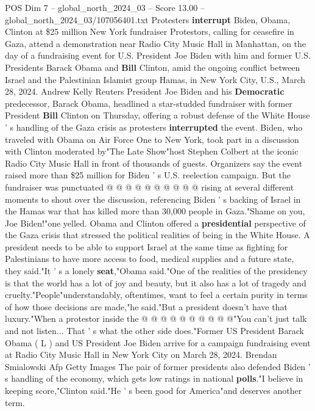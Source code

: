 \begin{textsample}{POS Dim 7 – global\_north\_2024\_03 – Score 13.00 – global\_north\_2024\_03/107056401.txt}  \label{ex:f7_pos_034}
Protesters \textbf{interrupt} Biden, Obama, Clinton at \$25 million New York fundraiser Protestors, calling for ceasefire in Gaza, attend a demonstration near Radio City Music Hall in Manhattan, on the day of a fundraising event for U.S.
President Joe Biden with him and former U.S.
Presidents Barack Obama and \textbf{Bill} Clinton, amid the ongoing conflict between Israel and the Palestinian Islamist group Hamas, in New York City, U.S., March 28, 2024.
Andrew Kelly Reuters President Joe Biden and his \textbf{Democratic} predecessor, Barack Obama, headlined a star-studded fundraiser with former President \textbf{Bill} Clinton on Thursday, offering a robust defense of the White House ' s handling of the Gaza crisis as protesters \textbf{interrupted} the event.
Biden, who traveled with Obama on Air Force One to New York, took part in a discussion with Clinton moderated by"The Late Show"host Stephen Colbert at the iconic Radio City Music Hall in front of thousands of guests.
Organizers say the event raised more than \$25 million for Biden ' s U.S. reelection campaign.
But the fundraiser was punctuated @ @ @ @ @ @ @ @ @ @ rising at several different moments to shout over the discussion, referencing Biden ' s backing of Israel in the Hamas war that has killed more than 30,000 people in Gaza."Shame on you, Joe Biden!"one yelled.
Obama and Clinton offered a \textbf{presidential} perspective of the Gaza crisis that stressed the political realities of being in the White House.
A president needs to be able to support Israel at the same time as fighting for Palestinians to have more access to food, medical supplies and a future state, they said."It ' s a lonely \textbf{seat},"Obama said."One of the realities of the presidency is that the world has a lot of joy and beauty, but it also has a lot of tragedy and cruelty."People"understandably, oftentimes, want to feel a certain purity in terms of how those decisions are made,"he said."But a president doesn't have that luxury."When a protestor inside the @ @ @ @ @ @ @ @ @ @"You can't just talk and not listen...
That ' s what the other side does."Former US President Barack Obama ( L ) and US President Joe Biden arrive for a campaign fundraising event at Radio City Music Hall in New York City on March 28, 2024.
Brendan Smialowski Afp Getty Images The pair of former presidents also defended Biden ' s handling of the economy, which gets low ratings in national \textbf{polls}."I believe in keeping score,"Clinton said."He ' s been good for America"and deserves another term.

\end{textsample}
